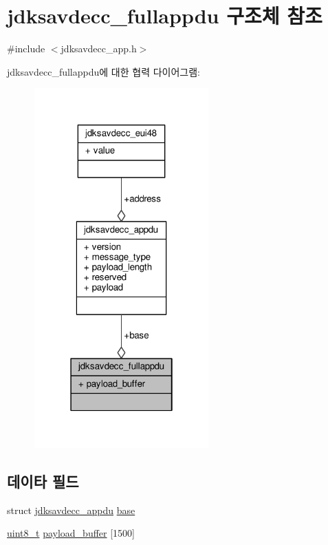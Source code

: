 \hypertarget{structjdksavdecc__fullappdu}{}\section{jdksavdecc\+\_\+fullappdu 구조체 참조}
\label{structjdksavdecc__fullappdu}


{\ttfamily \#include $<$jdksavdecc\+\_\+app.\+h$>$}



jdksavdecc\+\_\+fullappdu에 대한 협력 다이어그램\+:
\nopagebreak
\begin{figure}[H]
\begin{center}
\leavevmode
\includegraphics[width=190pt]{structjdksavdecc__fullappdu__coll__graph}
\end{center}
\end{figure}
\subsection*{데이타 필드}
\begin{DoxyCompactItemize}
\item 
struct \hyperlink{structjdksavdecc__appdu}{jdksavdecc\+\_\+appdu} \hyperlink{structjdksavdecc__fullappdu_af973673f33f79bf957f4ef909e1b7b04}{base}
\item 
\hyperlink{stdint_8h_aba7bc1797add20fe3efdf37ced1182c5}{uint8\+\_\+t} \hyperlink{structjdksavdecc__fullappdu_a23bd2d236338419a618efe0b79516509}{payload\+\_\+buffer} \mbox{[}1500\mbox{]}
\end{DoxyCompactItemize}


